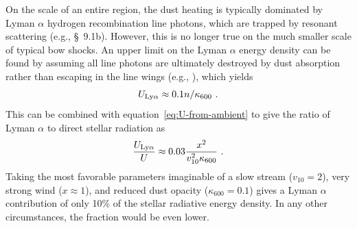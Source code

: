On the scale of an entire \hii{} region, the dust heating is typically
dominated by Lyman \(\alpha\) hydrogen recombination line photons, which
are trapped by resonant scattering (e.g., \citealp{Spitzer:1978a}
\S~9.1b).  However, this is no longer true on the much smaller scale
of typical bow shocks.  An upper limit on the Lyman \(\alpha\) energy
density can be found by assuming all line photons are ultimately
destroyed by dust absorption rather than escaping in the line wings
(e.g., \citealp{Henney:1998b}), which yields
\begin{equation}
  \label{eq:U-Lya}
  U_{\text{Ly}\alpha} \approx 0.1 n / \kappa_{600} \ .
\end{equation}
This can be combined with equation~\eqref{eq:U-from-ambient} to give
the ratio of Lyman \(\alpha\) to direct stellar radiation as
\begin{equation}
  \label{eq:Lya-over-stellar}
  \frac{U\Lya}{U} \approx 0.03 \frac{x^2}{v_{10}^2 \kappa_{600}} \ .
\end{equation}
Taking the most favorable parameters imaginable of a slow stream
(\(v_{10} = 2\)), very strong wind (\(x \approx 1\)), and reduced dust
opacity (\(\kappa_{600} = 0.1\)) gives a Lyman \(\alpha\) contribution of only
10\% of the stellar radiative energy density.  In any other
circumstances, the fraction would be even lower.


